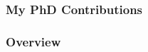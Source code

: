 \documentclass[8pt,xcolor=table,aspectratio=169]{beamer}
\begin{document}
\begin{frame}[label=current]
\frametitle{My PhD Contributions}

\begin{figure}
\centering


\ovEBM
\ovVWDPM

\ovDKT
\ovTadpole

\ovPainter

\end{figure}

\end{frame}



\begin{frame}
\frametitle{Overview}


\begin{figure}
\centering

{
\ovEBM
\ovVWDPM

\ovDKT}
\ovTadpole

{
\ovPainter
}



\end{figure}
\end{frame}





\end{document}
